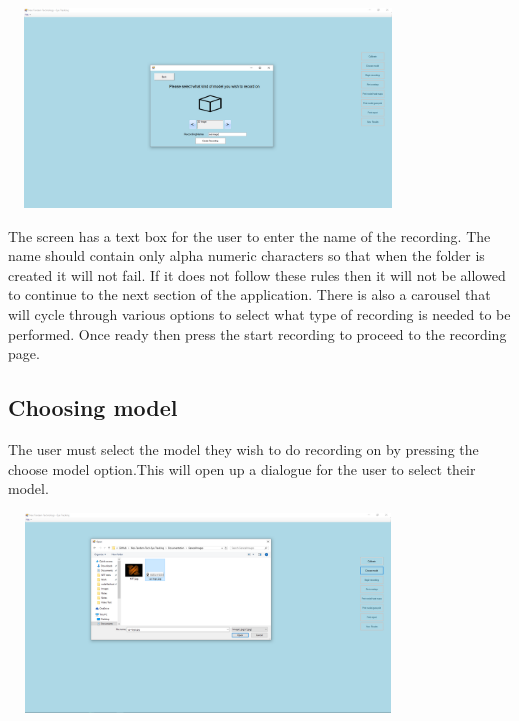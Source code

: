 \includegraphics[width=400px,height=200px]{./Images/ModelSelect.PNG}

The screen has a text box for the user to enter the name of the recording. The name should contain only alpha numeric characters so that when the folder is created it will not fail. If it does not follow these rules then it will not be allowed to continue to the next section of the application. There is also a carousel that will cycle through various options to select what type of recording is needed to be performed. Once ready then press the start recording to proceed to the recording page.

\subsection{Choosing model}
The user must select the model they wish to do recording on by pressing the choose model option.This will open up a dialogue for the user to select their model.

\includegraphics[width=400px,height=200px]{./Images/ChooseModel.PNG}

